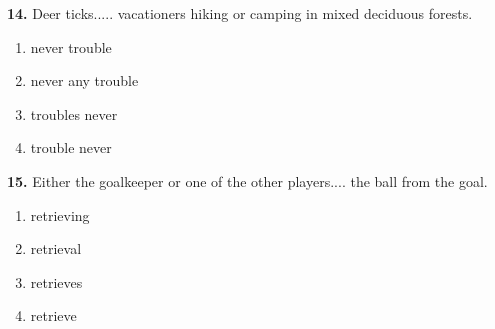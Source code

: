 \documentclass[12pt]{article}
\begin{document}
\noindent\textbf{14.} Deer ticks..... vacationers hiking or camping in mixed deciduous forests.
\begin{enumerate}[label=(\Alph*),leftmargin=*,itemsep=0.2em]
\item never trouble
\item never any trouble
\item troubles never
\item trouble never
\end{enumerate}
\par
\vspace{0.25\baselineskip}
\noindent\textbf{15.} Either the goalkeeper or one of the other players.... the ball from the goal.
\begin{enumerate}[label=(\Alph*),leftmargin=*,itemsep=0.2em]
\item retrieving
\item retrieval
\item retrieves
\item retrieve
\end{enumerate}
\par
\vspace{0.25\baselineskip}
\end{document}
